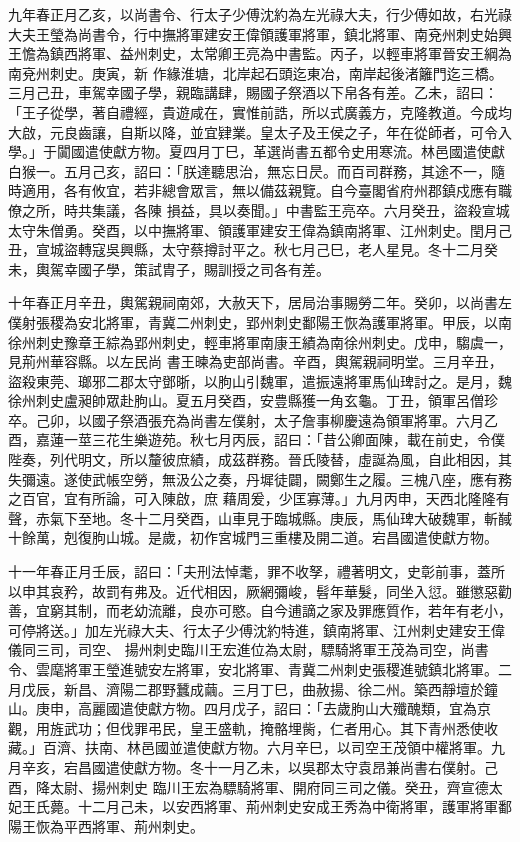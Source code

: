 \begin{pinyinscope}
 九年春正月乙亥，以尚書令、行太子少傅沈約為左光祿大夫，行少傅如故，右光祿大夫王瑩為尚書令，行中撫將軍建安王偉領護軍將軍，鎮北將軍、南兗州刺史始興王憺為鎮西將軍、益州刺史，太常卿王亮為中書監。丙子，以輕車將軍晉安王綱為南兗州刺史。庚寅，新
 作緣淮塘，北岸起石頭迄東冶，南岸起後渚籬門迄三橋。三月己丑，車駕幸國子學，親臨講肆，賜國子祭酒以下帛各有差。乙未，詔曰：「王子從學，著自禮經，貴遊咸在，實惟前誥，所以式廣義方，克隆教道。今成均大啟，元良齒讓，自斯以降，並宜肄業。皇太子及王侯之子，年在從師者，可令入學。」于闐國遣使獻方物。夏四月丁巳，革選尚書五都令史用寒流。林邑國遣使獻白猴一。五月己亥，詔曰：「朕達聽思治，無忘日昃。而百司群務，其途不一，隨時適用，各有攸宜，若非總會眾言，無以備茲親覽。自今臺閣省府州郡鎮戍應有職僚之所，時共集議，各陳
 損益，具以奏聞。」中書監王亮卒。六月癸丑，盜殺宣城太守朱僧勇。癸酉，以中撫將軍、領護軍建安王偉為鎮南將軍、江州刺史。閏月己丑，宣城盜轉寇吳興縣，太守蔡撙討平之。秋七月己巳，老人星見。冬十二月癸未，輿駕幸國子學，策試胄子，賜訓授之司各有差。



 十年春正月辛丑，輿駕親祠南郊，大赦天下，居局治事賜勞二年。癸卯，以尚書左僕射張稷為安北將軍，青冀二州刺史，郢州刺史鄱陽王恢為護軍將軍。甲辰，以南徐州刺史豫章王綜為郢州刺史，輕車將軍南康王績為南徐州刺史。戊申，騶虞一，見荊州華容縣。以左民尚
 書王暕為吏部尚書。辛酉，輿駕親祠明堂。三月辛丑，盜殺東莞、瑯邪二郡太守鄧晣，以朐山引魏軍，遣振遠將軍馬仙琕討之。是月，魏徐州刺史盧昶帥眾赴朐山。夏五月癸酉，安豊縣獲一角玄龜。丁丑，領軍呂僧珍卒。己卯，以國子祭酒張充為尚書左僕射，太子詹事柳慶遠為領軍將軍。六月乙酉，嘉蓮一莖三花生樂遊苑。秋七月丙辰，詔曰：「昔公卿面陳，載在前史，令僕陛奏，列代明文，所以釐彼庶績，成茲群務。晉氏陵替，虛誕為風，自此相因，其失彌遠。遂使武帳空勞，無汲公之奏，丹墀徒闢，闕鄭生之履。三槐八座，應有務之百官，宜有所論，可入陳啟，庶
 藉周爰，少匡寡薄。」九月丙申，天西北隆隆有聲，赤氣下至地。冬十二月癸酉，山車見于臨城縣。庚辰，馬仙琕大破魏軍，斬馘十餘萬，剋復朐山城。是歲，初作宮城門三重樓及開二道。宕昌國遣使獻方物。



 十一年春正月壬辰，詔曰：「夫刑法悼耄，罪不收孥，禮著明文，史彰前事，蓋所以申其哀矜，故罰有弗及。近代相因，厥網彌峻，髫年華髮，同坐入愆。雖懲惡勸善，宜窮其制，而老幼流離，良亦可愍。自今逋謫之家及罪應質作，若年有老小，可停將送。」加左光祿大夫、行太子少傅沈約特進，鎮南將軍、江州刺史建安王偉儀同三司，司空、
 揚州刺史臨川王宏進位為太尉，驃騎將軍王茂為司空，尚書令、雲麾將軍王瑩進號安左將軍，安北將軍、青冀二州刺史張稷進號鎮北將軍。二月戊辰，新昌、濟陽二郡野蠶成繭。三月丁巳，曲赦揚、徐二州。築西靜壇於鐘山。庚申，高麗國遣使獻方物。四月戊子，詔曰：「去歲朐山大殲醜類，宜為京觀，用旌武功；但伐罪弔民，皇王盛軌，掩骼埋胔，仁者用心。其下青州悉使收藏。」百濟、扶南、林邑國並遣使獻方物。六月辛巳，以司空王茂領中權將軍。九月辛亥，宕昌國遣使獻方物。冬十一月乙未，以吳郡太守袁昂兼尚書右僕射。己酉，降太尉、揚州刺史
 臨川王宏為驃騎將軍、開府同三司之儀。癸丑，齊宣德太妃王氏薨。十二月己未，以安西將軍、荊州刺史安成王秀為中衛將軍，護軍將軍鄱陽王恢為平西將軍、荊州刺史。




\end{pinyinscope}

